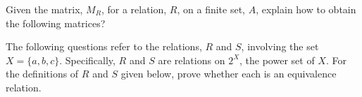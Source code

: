 \documentclass[addpoints]{exam}
\begin{document}
\begin{questions}
\begin{parts}
  \end{parts}
  
\question  Given the matrix, $M_R$, for a relation, $R$, on a finite set, $A$, explain how to obtain the following matrices?
  \begin{multicols}{2}
  \end{multicols}
  \begin{solution}
  \end{solution}
  
\question The following questions refer to the relations, $R$ and $S$, involving the set $X = \{a, b, c\}$. Specifically, $R$ and $S$ are relations on $2^X$, the power set of $X$. For the definitions of $R$ and $S$ given below, prove whether each is an equivalence relation.
  \begin{multicols}{2}
\end{multicols}
\end{questions}
\end{document}
